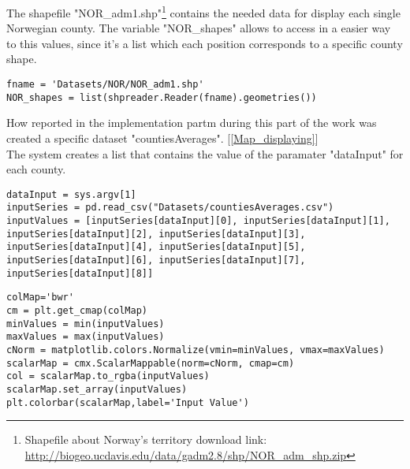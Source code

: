 The shapefile "NOR\_adm1.shp"\footnote{Shapefile about Norway's territory download link: \\ \url{http://biogeo.ucdavis.edu/data/gadm2.8/shp/NOR\_adm\_shp.zip}} contains the needed data for display each single Norwegian county. The variable "NOR\_shapes" allows to access in a easier way to this values, since it's a list which each position corresponds to a specific county shape.
\begin{lstlisting}
fname = 'Datasets/NOR/NOR_adm1.shp'
NOR_shapes = list(shpreader.Reader(fname).geometries())
\end{lstlisting}

How reported in the implementation partm during this part of the work was created a specific dataset "countiesAverages". [\ref{Map_displaying}] \\ The system creates a list that contains the value of the paramater "dataInput" for each county.
\begin{lstlisting}
dataInput = sys.argv[1]
inputSeries = pd.read_csv("Datasets/countiesAverages.csv")
inputValues = [inputSeries[dataInput][0], inputSeries[dataInput][1], inputSeries[dataInput][2], inputSeries[dataInput][3], inputSeries[dataInput][4], inputSeries[dataInput][5], inputSeries[dataInput][6], inputSeries[dataInput][7], inputSeries[dataInput][8]]
\end{lstlisting}

\begin{lstlisting}
colMap='bwr'
cm = plt.get_cmap(colMap)
minValues = min(inputValues)
maxValues = max(inputValues)
cNorm = matplotlib.colors.Normalize(vmin=minValues, vmax=maxValues)
scalarMap = cmx.ScalarMappable(norm=cNorm, cmap=cm)	
col = scalarMap.to_rgba(inputValues)	
scalarMap.set_array(inputValues)
plt.colorbar(scalarMap,label='Input Value')
\end{lstlisting}

\newpage

